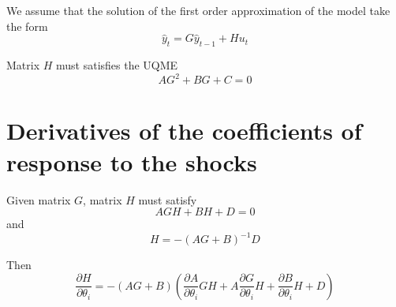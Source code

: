 \documentclass{article}
\begin{document}
We assume that the solution of the first order approximation of the
model take the form
\[
\hat y_t = G\hat y_{t-1} + Hu_t
\]

Matrix $H$ must satisfies the UQME
\[
A G^2 + B G + C = 0
\]

\section{Derivatives of the coefficients of response to the shocks}
Given matrix $G$, matrix $H$ must satisfy
\[
A G H + BH + D = 0
\]
and
\[
H = -(AG + B)^{-1}D
\]

Then
\[
\frac{\partial H}{\partial \theta_i} = -(AG + B)\left(\frac{\partial
  A}{\partial \theta_i}GH + A\frac{\partial G}{\partial \theta_i}H +
  \frac{\partial B}{\partial \theta_i}H + D\right)
\]
\end{document}
